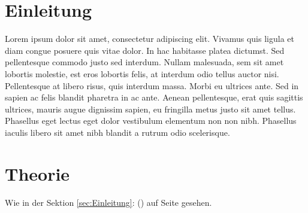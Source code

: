 \documentclass[10pt, a4paper]{article}
\begin{document}
\section{Einleitung \label{sec:Einleitung}}

Lorem ipsum dolor sit amet, consectetur adipiscing elit. Vivamus quis ligula et diam congue posuere quis vitae dolor. In hac habitasse platea dictumst. Sed pellentesque commodo justo sed interdum. Nullam malesuada, sem sit amet lobortis molestie, est eros lobortis felis, at interdum odio tellus auctor nisi. Pellentesque at libero risus, quis interdum massa. Morbi eu ultrices ante. Sed in sapien ac felis blandit pharetra in ac ante. Aenean pellentesque, erat quis sagittis ultrices, mauris augue dignissim sapien, eu fringilla metus justo sit amet tellus. Phasellus eget lectus eget dolor vestibulum elementum non non nibh. Phasellus iaculis libero sit amet nibh blandit a rutrum odio scelerisque.

\newpage

\section{Theorie \label{sec:Theorie}}
Wie in der Sektion \ref{sec:Einleitung}: () auf Seite \pageref{sec:Einleitung} gesehen.
\end{document}

